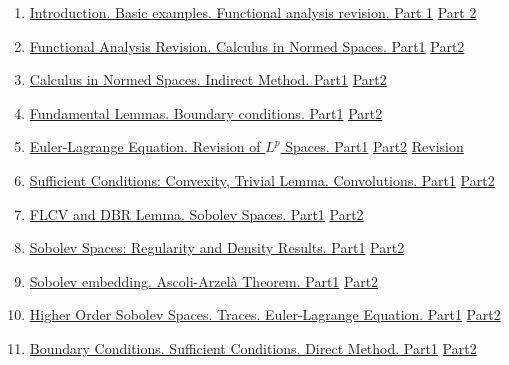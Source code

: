 \documentclass[11pt]{article}
\begin{document}
\begin{enumerate}
	\item \href{https://mp.weixin.qq.com/s/A0Nn95o2yqF5vqGeG6Bhkg}{Introduction. Basic examples. Functional analysis  revision. Part 1}  \quad \href{https://mp.weixin.qq.com/s/PxGcikR3U59UH8pFilmAdQ}{Part 2} %
	\item \href{https://mp.weixin.qq.com/s/2lGKir-zolq4q77RAkzvKg}{Functional Analysis Revision. Calculus in Normed Spaces. Part1} \quad \href{https://mp.weixin.qq.com/s/-r-1wN6hfq0rfFdFWXb5Fw}{Part2} %
	\item \href{https://mp.weixin.qq.com/s/6EFFPQNBgrt6TlmoWP-VKg}{Calculus in Normed Spaces. Indirect Method. Part1} \quad \href{https://mp.weixin.qq.com/s/x3-0awsAMsinItFgnwyF7g}{Part2} %
	\item \href{https://mp.weixin.qq.com/s/XvVVyOvx00HBHa2Gkt-Q_A}{Fundamental Lemmas. Boundary conditions. Part1} \quad \href{https://mp.weixin.qq.com/s/TbJycXsjTNSZv2mYN0cvCg}{Part2} %
	\item \href{https://mp.weixin.qq.com/s/UkBV_MDS8k5bvHeM1pAtSQ}{Euler-Lagrange Equation. Revision of $L^{p}$ Spaces. Part1} \quad \href{https://mp.weixin.qq.com/s/OeMerMePwpczXTmNv1SBOg}{Part2} \quad \href{https://mp.weixin.qq.com/s/zGPYm_OG4OmekGsGauM8YA}{Revision} %
	\item  \href{https://mp.weixin.qq.com/s/AGJ7LAdLBNxm4LMaa4C8YA}{Sufficient Conditions: Convexity, Trivial Lemma. Convolutions. Part1} \quad \href{https://mp.weixin.qq.com/s/gV76EBci2jua3hdxRL0wjw}{Part2} %
	\item \href{https://mp.weixin.qq.com/s/U519vGvCKjJjIt-lRs1j8w}{FLCV and DBR Lemma. Sobolev Spaces. Part1} \quad \href{https://mp.weixin.qq.com/s/KG63b67pEnliDFXEc2OUIQ}{Part2} %
	\item \href{https://mp.weixin.qq.com/s/yJMq5NXmXGNYB6_PuBH--A}{Sobolev Spaces: Regularity and Density Results. Part1} \quad \href{https://mp.weixin.qq.com/s/iRvZ5YMDvUgD4EOObP7kgQ}{Part2} %
	\item  \href{https://mp.weixin.qq.com/s/mDfF2IzrRaNkWHiCmxo_5A}{Sobolev embedding. Ascoli-Arzel\`{a} Theorem. Part1} \quad \href{https://mp.weixin.qq.com/s/1Ov-FTbZSCX_cI6dkHJp0g}{Part2} %
	\item  \href{https://mp.weixin.qq.com/s/u9A8c0H1K066h3_cr9MFkw}{Higher Order Sobolev Spaces. Traces. Euler-Lagrange Equation. Part1} \quad \href{https://mp.weixin.qq.com/s/F9_mA1TG65n0QVTPkr9vcA}{Part2} %
	\item  \href{https://mp.weixin.qq.com/s/j-JvJ8KeTgbYn186wct3eg}{Boundary Conditions. Sufficient Conditions. Direct Method. Part1} \quad \href{https://mp.weixin.qq.com/s/upXcmc1HHbyn1TS7A-sfuA}{Part2} %

\end{enumerate}
\end{document}
